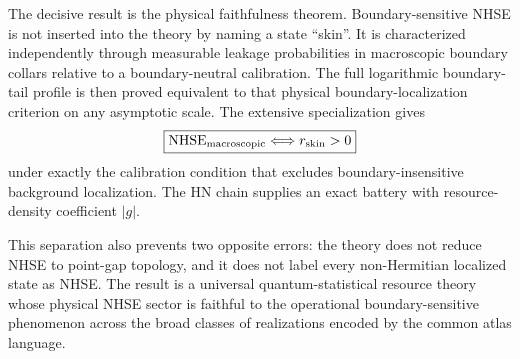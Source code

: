 \documentclass[11pt]{article}
\begin{document}
The decisive result is the physical faithfulness theorem. Boundary-sensitive NHSE is not inserted into the theory by naming a state ``skin''. It is characterized independently through measurable leakage probabilities in macroscopic boundary collars relative to a boundary-neutral calibration. The full logarithmic boundary-tail profile is then proved equivalent to that physical boundary-localization criterion on any asymptotic scale. The extensive specialization gives
\[
\boxed{
\mathrm{NHSE}_{\rm macroscopic}
\Longleftrightarrow
r_{\rm skin}>0
}
\]
under exactly the calibration condition that excludes boundary-insensitive background localization. The HN chain supplies an exact battery with resource-density coefficient $|g|$.

This separation also prevents two opposite errors: the theory does not reduce NHSE to point-gap topology, and it does not label every non-Hermitian localized state as NHSE. The result is a universal quantum-statistical resource theory whose physical NHSE sector is faithful to the operational boundary-sensitive phenomenon across the broad classes of realizations encoded by the common atlas language.
\end{document}
